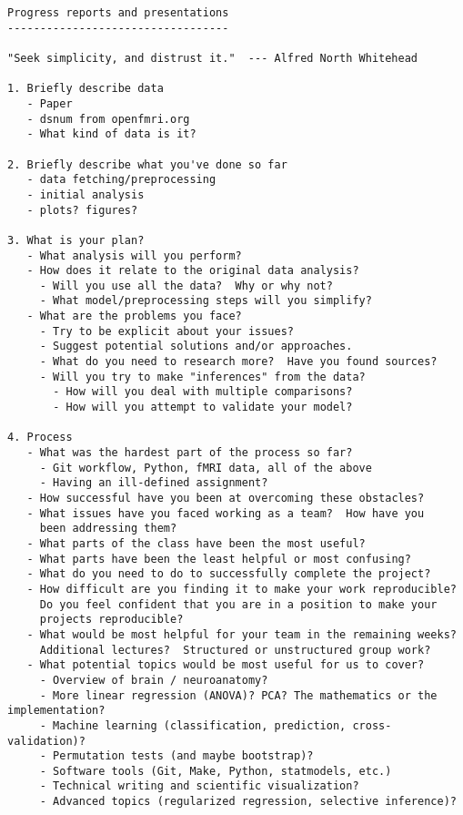 \begin{verbatim}
Progress reports and presentations
----------------------------------

"Seek simplicity, and distrust it."  --- Alfred North Whitehead

1. Briefly describe data
   - Paper
   - dsnum from openfmri.org
   - What kind of data is it?

2. Briefly describe what you've done so far
   - data fetching/preprocessing
   - initial analysis
   - plots? figures?

3. What is your plan?
   - What analysis will you perform?
   - How does it relate to the original data analysis?
     - Will you use all the data?  Why or why not?
     - What model/preprocessing steps will you simplify?
   - What are the problems you face?
     - Try to be explicit about your issues?
     - Suggest potential solutions and/or approaches.
     - What do you need to research more?  Have you found sources?
     - Will you try to make "inferences" from the data?
       - How will you deal with multiple comparisons?
       - How will you attempt to validate your model?     

4. Process
   - What was the hardest part of the process so far?
     - Git workflow, Python, fMRI data, all of the above
     - Having an ill-defined assignment?
   - How successful have you been at overcoming these obstacles?
   - What issues have you faced working as a team?  How have you
     been addressing them?
   - What parts of the class have been the most useful?
   - What parts have been the least helpful or most confusing?
   - What do you need to do to successfully complete the project?
   - How difficult are you finding it to make your work reproducible?
     Do you feel confident that you are in a position to make your
     projects reproducible?
   - What would be most helpful for your team in the remaining weeks?
     Additional lectures?  Structured or unstructured group work?
   - What potential topics would be most useful for us to cover?
     - Overview of brain / neuroanatomy?
     - More linear regression (ANOVA)? PCA? The mathematics or the implementation?
     - Machine learning (classification, prediction, cross-validation)?
     - Permutation tests (and maybe bootstrap)?
     - Software tools (Git, Make, Python, statmodels, etc.)
     - Technical writing and scientific visualization?
     - Advanced topics (regularized regression, selective inference)?
\end{verbatim}
